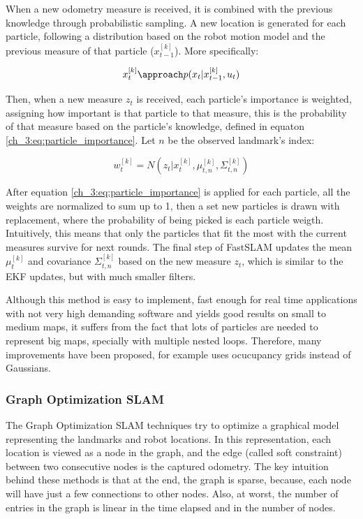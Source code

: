       When a new odometry measure is received, it is combined with the previous knowledge through probabilistic sampling. A new location is generated for each particle, following a distribution based on the robot motion model and the previous measure of that particle ($x_{t-1}^{[k]}$). More specifically:

      \begin{equation} \label{ch_3:eq:particle_update}
        x_{t}^{[k]} \approach p(x_{t} | x_{t-1}^{[k]}, u_{t})
      \end{equation}

      Then, when a new measure $z_{t}$ is received, each particle's importance is weighted, assigning how important is that particle to that measure, this is the probability of that measure based on the particle's knowledge, defined in equaton \ref{ch_3:eq:particle_importance}. Let $n$ be the observed landmark's index:

      \begin{equation} \label{ch_3:eq:particle_importance}
        w_{t}^{[k]} = N(z_{t} | x_{t}^{[k]}, \mu_{t,n}^{[k]}, \Sigma_{t,n}^{[k]})
      \end{equation}

      After equation \ref{ch_3:eq:particle_importance} is applied for each particle, all the weights are normalized to sum up to 1, then a set new particles is drawn with replacement, where the probability of being picked is each particle weigth. Intuitively, this means that only the particles that fit the most with the current measures survive for next rounds. The final step of FastSLAM updates the mean $\mu_{t}^{[k]}$ and covariance $\Sigma_{t,n}^{[k]}$ based on the new measure $z_{t}$, which is similar to the EKF updates, but with much smaller filters.

      Although this method is easy to implement, fast enough for real time applications with not very high demanding software and yields good results on small to medium maps, it suffers from the fact that lots of particles are needed to represent big maps, specially with multiple nested loops. Therefore, many improvements have been proposed, \cite{Grisetti2007} for example uses ocucupancy grids instead of Gaussians.

    \subsubsection{Graph Optimization SLAM}

      The Graph Optimization SLAM techniques try to optimize a graphical model representing the landmarks and robot locations. In this representation, each location is viewed as a node in the graph, and the edge (called soft constraint) between two consecutive nodes is the captured odometry. The key intuition behind these methods is that at the end, the graph is sparse, because, each node will have just a few connections to other nodes. Also, at worst, the number of entries in the graph is linear in the time elapsed and in the number of nodes.

